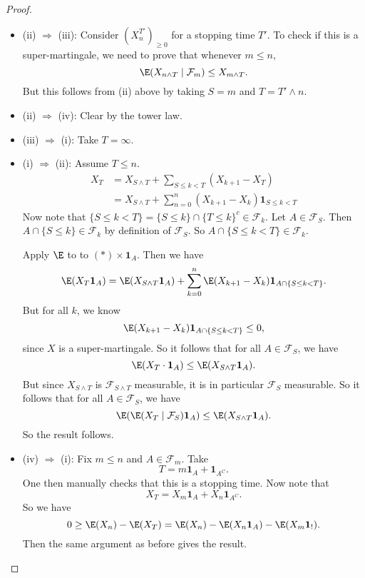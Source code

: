 \documentclass[a4paper]{article}
\begin{document}
\begin{proof}\leavevmode
  \begin{itemize}
    \item (ii) $\Rightarrow$ (iii): Consider $(X_n^{T'})_{ \geq 0}$ for a stopping time $T'$. To check if this is a super-martingale, we need to prove that whenever $m \leq n$,
      \[
        \E(X_{n \wedge T} \mid \mathcal{F}_m) \leq X_{m \wedge T}.
      \]
      But this follows from (ii) above by taking $S = m$ and $T = T' \wedge n$.
    \item (ii) $\Rightarrow$ (iv): Clear by the tower law.
    \item (iii) $\Rightarrow$ (i): Take $T = \infty$.
    \item (i) $\Rightarrow$ (ii): Assume $T \leq n$.
      \begin{align*}
        X_T &= X_{S \wedge T} + \sum_{S \leq k < T} (X_{k + 1} - X_T)\\
        &= X_{S \wedge T} + \sum_{n = 0}^n (X_{k + 1} - X_k) \mathbf{1}_{S \leq k < T} \tag{$*$}
      \end{align*}
      Now note that $\{S \leq k < T\} = \{S \leq k\} \cap \{T \leq k\}^c \in \mathcal{F}_k$. Let $A \in \mathcal{F}_S$. Then $A \cap \{S \leq k\} \in \mathcal{F}_k$ by definition of $\mathcal{F}_S$. So $A \cap \{S \leq k < T\} \in \mathcal{F}_k$.

      Apply $\E$ to to $(*) \times \mathbf{1}_A$. Then we have
      \[
        \E (X_T \mathbf{1}_A) = \E(X_{S \wedge T} \mathbf{1}_A) + \sum_{k = 0}^n \E(X_{k + 1} - X_k) \mathbf{1}_{A \cap \{S \leq k < T\}}.
      \]
      But for all $k$, we know
      \[
        \E(X_{k + 1} - X_k) \mathbf{1}_{A \cap \{S \leq k < T\}} \leq 0,
      \]
      since $X$ is a super-martingale. So it follows that for all $A \in \mathcal{F}_S$, we have
      \[
        \E(X_T \cdot \mathbf{1}_A) \leq \E(X_{S \wedge T} \mathbf{1}_A).
      \]
      But since $X_{S \wedge T}$ is $\mathcal{F}_{S \wedge T}$ measurable, it is in particular $\mathcal{F}_S$ measurable. So it follows that for all $A \in \mathcal{F}_S$, we have
      \[
        \E(\E (X_T \mid \mathcal{F}_S) \mathbf{1}_A) \leq \E(X_{S \wedge T} \mathbf{1}_A).
      \]
      So the result follows.
    \item (iv) $\Rightarrow$ (i): Fix $m \leq n$ and $A \in \mathcal{F}_m$. Take
      \[
        T = m \mathbf{1}_A + \mathbf{1}_{A^C}.
      \]
      One then manually checks that this is a stopping time. Now note that
      \[
        X_T = X_m \mathbf{1}_{A} + X_n \mathbf{1}_{A^C}.
      \]
      So we have
      \[
        0 \geq \E(X_n) - \E(X_T) = \E(X_n) - \E(X_n \mathbf{1}_A) - \E(X_m \mathbf{1}_!).
      \]
      Then the same argument as before gives the result.\qedhere
  \end{itemize}
\end{proof}
\end{document}
